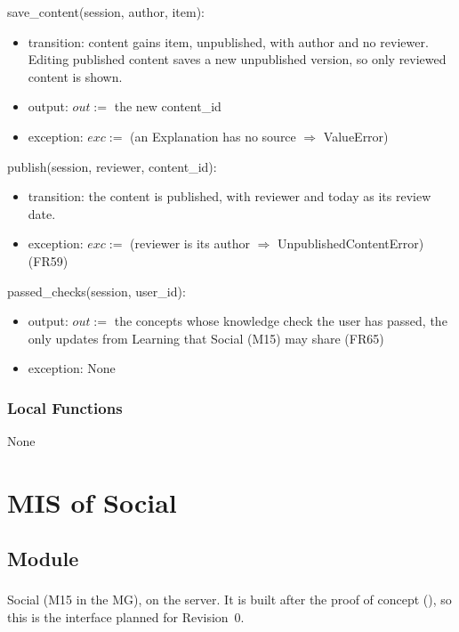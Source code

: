 \documentclass[12pt, titlepage]{article}
\begin{document}
\noindent save\_content(session, author, item):
\begin{itemize}
\item transition: content gains item, unpublished, with author and no
  reviewer. Editing published content saves a new unpublished version, so
  only reviewed content is shown.
\item output: $out :=$ the new content\_id
\item exception: $exc :=$ (an Explanation has no source $\Rightarrow$
  ValueError)
\end{itemize}

\noindent publish(session, reviewer, content\_id):
\begin{itemize}
\item transition: the content is published, with reviewer and today as its
  review date.
\item exception: $exc :=$ (reviewer is its author $\Rightarrow$
  UnpublishedContentError) (FR59)
\end{itemize}

\noindent passed\_checks(session, user\_id):
\begin{itemize}
\item output: $out :=$ the concepts whose knowledge check the user has
  passed, the only updates from Learning that Social (M15) may share (FR65)
\item exception: None
\end{itemize}

\subsubsection{Local Functions}

None

\par\endgroup

\newpage

\section{MIS of Social} \label{MisSocial}

\begingroup\raggedright
\subsection{Module}

Social (M15 in the MG), on the server. It is built after the proof of concept
(\textsuperscript{\dag}), so this is the interface planned for Revision~0.
\end{document}
